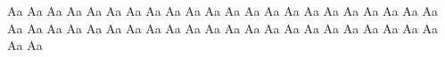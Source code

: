 \documentclass{worksheet}
\begin{document}
\begin{drillsheet}
\calligra
Aa Aa Aa Aa Aa Aa Aa Aa Aa Aa Aa Aa Aa Aa Aa Aa Aa Aa Aa Aa Aa Aa Aa Aa Aa Aa Aa Aa Aa Aa Aa Aa Aa Aa Aa Aa Aa Aa Aa Aa Aa Aa Aa Aa Aa Aa
\end{drillsheet}
\end{document}
